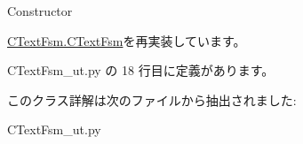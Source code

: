 \begin{DoxyVerb}Constructor
\end{DoxyVerb}
 

\mbox{\hyperlink{classCTextFsm_1_1CTextFsm_ae888a03cec9e1bb808d590dc35a9ec6b}{C\+Text\+Fsm.\+C\+Text\+Fsm}}を再実装しています。



 C\+Text\+Fsm\+\_\+ut.\+py の 18 行目に定義があります。



このクラス詳解は次のファイルから抽出されました\+:\begin{DoxyCompactItemize}
\item 
C\+Text\+Fsm\+\_\+ut.\+py\end{DoxyCompactItemize}
